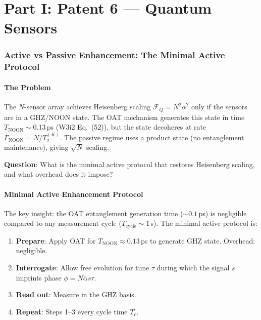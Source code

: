 \documentclass[11pt]{article}
\theoremstyle{definition}
\theoremstyle{remark}
\begin{document}

\part*{Part I: Patent 6 --- Quantum Sensors}

\section{Active vs Passive Enhancement: The Minimal Active Protocol}
\label{sec:active-passive}

\subsection{The Problem}

The $N$-sensor array achieves Heisenberg scaling $\mathcal{F}_Q = N^2
\bar{\alpha}^2$ only if the sensors are in a GHZ/NOON state. The OAT
mechanism generates this state in time $T_{\mathrm{NOON}} \sim 0.13$\,ps
(W3i2 Eq.~(52)), but the state decoheres at rate $\Gamma_{\mathrm{NOON}}
= N/T_2^{(K)}$. The passive regime uses a product state (no entanglement
maintenance), giving $\sqrt{N}$ scaling.

\textbf{Question}: What is the minimal active protocol that restores
Heisenberg scaling, and what overhead does it impose?

\subsection{Minimal Active Enhancement Protocol}

The key insight: the OAT entanglement generation time ($\sim 0.1$\,ps)
is negligible compared to any measurement cycle ($T_{\mathrm{cycle}}
\sim 1$\,s). The minimal active protocol is:

\begin{enumerate}
\item \textbf{Prepare}: Apply OAT for $T_{\mathrm{NOON}} \approx 0.13$\,ps
to generate GHZ state. Overhead: negligible.
\item \textbf{Interrogate}: Allow free evolution for time $\tau$ during
which the signal $s$ imprints phase $\phi = N \bar{\alpha} s \tau$.
\item \textbf{Read out}: Measure in the GHZ basis.
\item \textbf{Repeat}: Steps 1--3 every cycle time $T_c$.
\end{enumerate}
\end{document}
